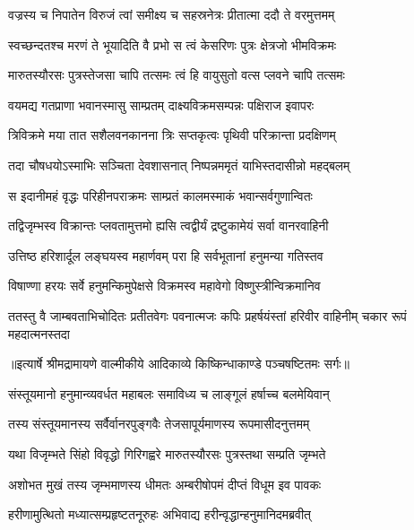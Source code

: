 \twolineshloka
{वज्रस्य च निपातेन विरुजं त्वां समीक्ष्य च}
{सहस्रनेत्रः प्रीतात्मा ददौ ते वरमुत्तमम्} %

\twolineshloka
{स्वच्छन्दतश्च मरणं ते भूयादिति वै प्रभो}
{स त्वं केसरिणः पुत्रः क्षेत्रजो भीमविक्रमः} %

\twolineshloka
{मारुतस्यौरसः पुत्रस्तेजसा चापि तत्समः}
{त्वं हि वायुसुतो वत्स प्लवने चापि तत्समः} %

\twolineshloka
{वयमद्य गतप्राणा भवानस्मासु साम्प्रतम्}
{दाक्ष्यविक्रमसम्पन्नः पक्षिराज इवापरः} %

\twolineshloka
{त्रिविक्रमे मया तात सशैलवनकानना}
{त्रिः सप्तकृत्वः पृथिवी परिक्रान्ता प्रदक्षिणम्} %

\twolineshloka
{तदा चौषधयोऽस्माभिः सञ्चिता देवशासनात्}
{निष्पन्नममृतं याभिस्तदासीन्नो महद्बलम्} %

\twolineshloka
{स इदानीमहं वृद्धः परिहीनपराक्रमः}
{साम्प्रतं कालमस्माकं भवान्सर्वगुणान्वितः} %

\twolineshloka
{तद्विजृम्भस्व विक्रान्तः प्लवतामुत्तमो ह्यसि}
{त्वद्वीर्यं द्रष्टुकामेयं सर्वा वानरवाहिनी} %

\twolineshloka
{उत्तिष्ठ हरिशार्दूल लङ्घयस्व महार्णवम्}
{परा हि सर्वभूतानां हनुमन्या गतिस्तव} %

\twolineshloka
{विषाण्णा हरयः सर्वे हनुमन्किमुपेक्षसे}
{विक्रमस्व महावेगो विष्णुस्त्रीन्विक्रमानिव} %

\fourlineindentedshloka
{ततस्तु वै जाम्बवताभिचोदितः}
{प्रतीतवेगः पवनात्मजः कपिः}
{प्रहर्षयंस्तां हरिवीर वाहिनीम्}
{चकार रूपं महदात्मनस्तदा} %


{॥इत्यार्षे श्रीमद्रामायणे वाल्मीकीये आदिकाव्ये किष्किन्धाकाण्डे पञ्चषष्टितमः सर्गः॥}


\twolineshloka
{संस्तूयमानो हनुमान्व्यवर्धत महाबलः}
{समाविध्य च लाङ्गूलं हर्षाच्च बलमेयिवान्} %

\twolineshloka
{तस्य संस्तूयमानस्य सर्वैर्वानरपुङ्गवैः}
{तेजसापूर्यमाणस्य रूपमासीदनुत्तमम्} %

\twolineshloka
{यथा विजृम्भते सिंहो विवृद्धो गिरिगह्वरे}
{मारुतस्यौरसः पुत्रस्तथा सम्प्रति जृम्भते} %

\twolineshloka
{अशोभत मुखं तस्य जृम्भमाणस्य धीमतः}
{अम्बरीषोपमं दीप्तं विधूम इव पावकः} %

\twolineshloka
{हरीणामुत्थितो मध्यात्सम्प्रहृष्टतनूरुहः}
{अभिवाद्य हरीन्वृद्धान्हनुमानिदमब्रवीत्} %

